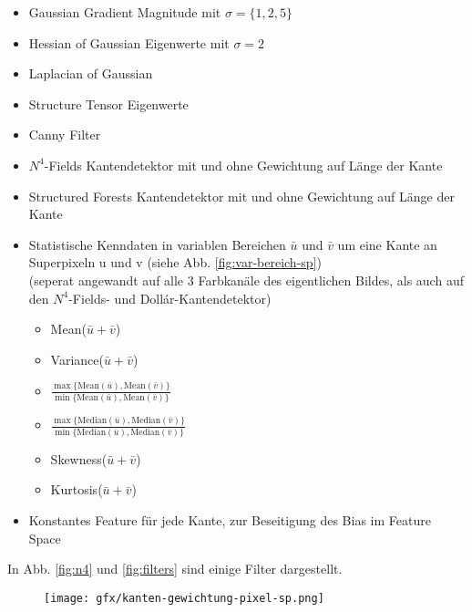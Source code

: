 \begin{itemize}
	\item Gaussian Gradient Magnitude mit $\sigma=\{1, 2, 5\}$
	\item Hessian of Gaussian Eigenwerte mit $\sigma=2$
	\item Laplacian of Gaussian
	\item Structure Tensor Eigenwerte
	\item Canny Filter
	\item $N^4$-Fields Kantendetektor \cite{n4} mit und ohne Gewichtung auf Länge der Kante
	\item Structured Forests Kantendetektor \cite[Dollár et al.]{dollar} mit und ohne Gewichtung auf Länge der Kante
	\item Statistische Kenndaten in variablen Bereichen $\bar{u}$ und $\bar{v}$ um eine Kante an Superpixeln u und v (siehe Abb. \ref{fig:var-bereich-sp}) \\
	(seperat angewandt auf alle 3 Farbkanäle des eigentlichen Bildes, als auch auf den $N^4$-Fields- und Dollár-Kantendetektor)
	\begin{itemize}
		\item Mean($\bar{u} + \bar{v}$)
		\item Variance($\bar{u} + \bar{v}$)
		\item $\frac{\max{\{\text{Mean}(\bar{u}), \text{Mean}(\bar{v}) \}}}{\min{\{\text{Mean}(\bar{u}), \text{Mean}(\bar{v})}\}}$
		\item $\frac{\max{\{\text{Median}(\bar{u}), \text{Median}(\bar{v}) \}}}{\min{\{\text{Median}(\bar{u}), \text{Median}(\bar{v})}\}}$
		\item Skewness($\bar{u} + \bar{v}$)
		\item Kurtosis($\bar{u} + \bar{v}$)
	\end{itemize}
	\item Konstantes Feature für jede Kante, zur Beseitigung des Bias im Feature Space
\end{itemize}

In Abb. \ref{fig:n4} und \ref{fig:filters} sind einige Filter dargestellt. 

\newpage

\begin{figure}[H]
	\centering
	\texttt{[image: gfx/kanten-gewichtung-pixel-sp.png]}
\end{figure}
\label{fig:kanten-gewichtung-pixel-sp}
\vspace{0.5cm}

